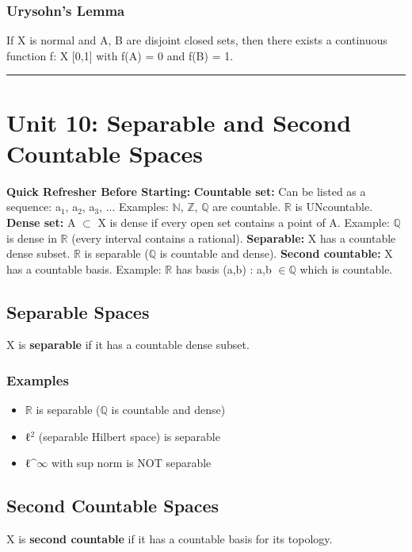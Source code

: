\documentclass[12pt,a4paper,openany]{book}
\begin{document}
{{\subsubsection{ Urysohn's Lemma}
If X is normal and A, B are disjoint closed sets, then there exists a continuous function f: X  [0,1] with f(A) = {0} and f(B) = {1}.

\bigskip\noindent\rule{\textwidth}{0.4pt}\bigskip

\section{Unit 10: Separable and Second Countable Spaces}

\begin{prereqbox}
 \textbf{Quick Refresher Before Starting:}
\textbf{Countable set:} Can be listed as a sequence: a$_1$, a$_2$, a$_3$, ... Examples: $\mathbb{N}$, $\mathbb{Z}$, $\mathbb{Q}$ are countable. $\mathbb{R}$ is UNcountable.
\textbf{Dense set:} A $\subset$ X is dense if every open set contains a point of A. Example: $\mathbb{Q}$ is dense in $\mathbb{R}$ (every interval contains a rational).
\textbf{Separable:} X has a countable dense subset. $\mathbb{R}$ is separable ($\mathbb{Q}$ is countable and dense).
\textbf{Second countable:} X has a countable basis. Example: $\mathbb{R}$ has basis {(a,b) : a,b $\in\mathbb{Q}$} which is countable.
\end{prereqbox}


\subsection{Separable Spaces}
X is \textbf{separable} if it has a countable dense subset.

\subsubsection{Examples}
\begin{itemize}[leftmargin=*]
  \item $\mathbb{R}$ is separable ($\mathbb{Q}$ is countable and dense)
  \item ℓ$^2$ (separable Hilbert space) is separable
  \item ℓ^$\infty$ with sup norm is NOT separable
\end{itemize}

\subsection{Second Countable Spaces}
X is \textbf{second countable} if it has a countable basis for its topology.

}}
\end{document}
